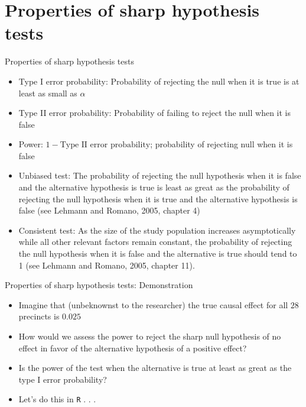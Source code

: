 \documentclass[table, xcolor={dvipsnames}, 9pt]{beamer}
\theoremstyle{newstyle}
\begin{document}
\section{Properties of sharp hypothesis tests}
\begin{frame}{Properties of sharp hypothesis tests}
\begin{itemize}
\item Type I error probability: Probability of rejecting the null when it is true is at least as small as $\alpha$ \pause 
\item Type II error probability: Probability of failing to reject the null when it is false  \pause 
\item Power: $1 - \text{Type II error probability}$; probability of rejecting null when it is false \pause 
\item Unbiased test: The probability of rejecting the null hypothesis when it is false and the alternative hypothesis is true is least as great as the probability of rejecting the null hypothesis when it is true and the alternative hypothesis is false (see Lehmann and Romano, 2005, chapter 4) \pause 
\item Consistent test: As the size of the study population increases asymptotically while all other relevant factors remain constant, the probability of rejecting the null hypothesis when it is false and the alternative is true should tend to 1 (see Lehmann and Romano, 2005, chapter 11).
\end{itemize}
\end{frame}
\begin{frame}{Properties of sharp hypothesis tests: Demonstration}
\begin{itemize}
\item Imagine that (unbeknownst to the researcher) the true causal effect for all $28$ precincts is $0.025$ \pause 
\item How would we assess the power to reject the sharp null hypothesis of no effect in favor of the alternative hypothesis of a positive effect? \pause 
\item Is the power of the test when the alternative is true at least as great as the type I error probability? \pause 
\item Let's do this in \texttt{R} . . . 
\end{itemize} 
\end{frame}
\end{document}
